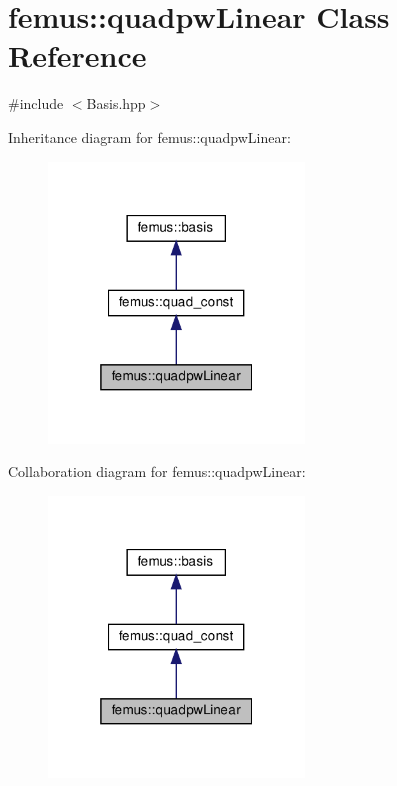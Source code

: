 \hypertarget{classfemus_1_1quadpw_linear}{}\section{femus\+:\+:quadpw\+Linear Class Reference}
\label{classfemus_1_1quadpw_linear}


{\ttfamily \#include $<$Basis.\+hpp$>$}



Inheritance diagram for femus\+:\+:quadpw\+Linear\+:
\nopagebreak
\begin{figure}[H]
\begin{center}
\leavevmode
\includegraphics[width=193pt]{classfemus_1_1quadpw_linear__inherit__graph}
\end{center}
\end{figure}


Collaboration diagram for femus\+:\+:quadpw\+Linear\+:
\nopagebreak
\begin{figure}[H]
\begin{center}
\leavevmode
\includegraphics[width=193pt]{classfemus_1_1quadpw_linear__coll__graph}
\end{center}
\end{figure}
